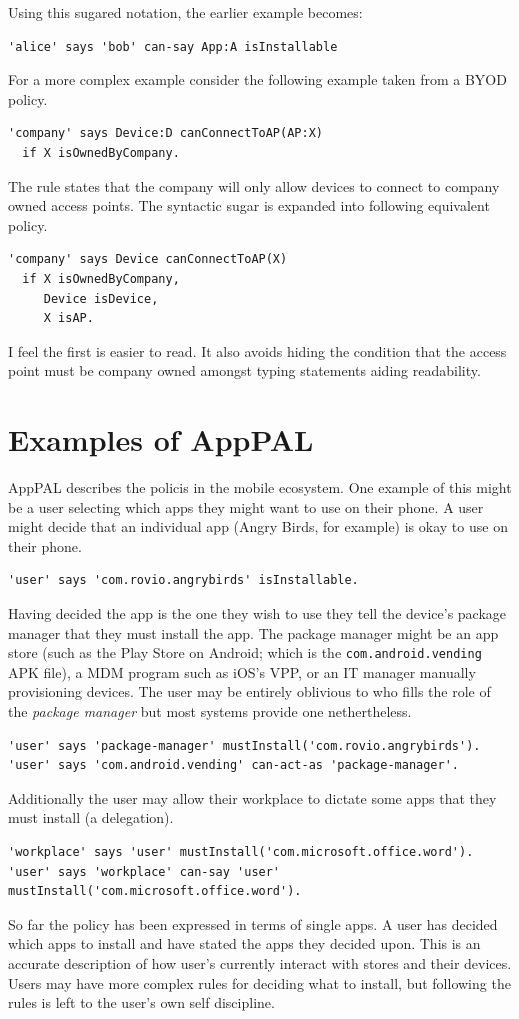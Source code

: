 \documentclass[thesis.tex]{subfiles}
\begin{document}
Using this sugared notation, the earlier example becomes:
\begin{lstlisting}
'alice' says 'bob' can-say App:A isInstallable
\end{lstlisting}

For a more complex example consider the following example taken from a BYOD policy.
\begin{lstlisting}
'company' says Device:D canConnectToAP(AP:X) 
  if X isOwnedByCompany.
\end{lstlisting}
The rule states that the company will only allow devices to connect to company owned access points.
The syntactic sugar is expanded into following equivalent policy.
\begin{lstlisting}
'company' says Device canConnectToAP(X) 
  if X isOwnedByCompany,
     Device isDevice,
     X isAP.
\end{lstlisting}
I feel the first is easier to read.
It also avoids hiding the condition that the access point must be company owned amongst typing statements aiding readability.


\section{Examples of AppPAL}

AppPAL describes the policis in the mobile ecosystem.
One example of this might be a user selecting which apps they might want to use on their phone.
A user might decide that an individual app (Angry Birds, for example) is okay to use on their phone.
\begin{lstlisting}
'user' says 'com.rovio.angrybirds' isInstallable.
\end{lstlisting}
Having decided the app is the one they wish to use they tell the device's package manager that they must install the app.
The package manager might be an app store (such as the Play Store on Android; which is the \texttt{com.android.vending} APK file), a \ac{MDM} program such as iOS's \ac{VPP}, or an IT manager manually provisioning devices.
The user may be entirely oblivious to who fills the role of the \emph{package manager} but most systems provide one nethertheless.
\begin{lstlisting}
'user' says 'package-manager' mustInstall('com.rovio.angrybirds').
'user' says 'com.android.vending' can-act-as 'package-manager'.
\end{lstlisting}
Additionally the user may allow their workplace to dictate some apps that they must install (a delegation).
\begin{lstlisting}
'workplace' says 'user' mustInstall('com.microsoft.office.word').
'user' says 'workplace' can-say 'user' mustInstall('com.microsoft.office.word').
\end{lstlisting}
So far the policy has been expressed in terms of single apps.
A user has decided which apps to install and have stated the apps they decided upon.
This is an accurate description of how user's currently interact with stores and their devices.
Users may have more complex rules for deciding what to install, but following the rules is left to the user's own self discipline.
\end{document}
